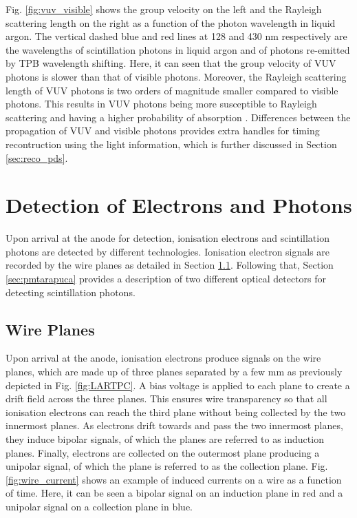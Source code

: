 Fig. \ref{fig:vuv_visible} shows the group velocity on the left and the Rayleigh scattering length on the right as a function of the photon wavelength in liquid argon.
The vertical dashed blue and red lines at 128 and 430 nm respectively are the wavelengths of scintillation photons in liquid argon and of photons re-emitted by TPB wavelength shifting. 
Here, it can seen that the group velocity of VUV photons is slower than that of visible photons.
Moreover, the Rayleigh scattering length of VUV photons is two orders of magnitude smaller compared to visible photons.
This results in VUV photons being more susceptible to Rayleigh scattering and having a higher probability of absorption \cite{PatrickPhD}.
Differences between the propagation of VUV and visible photons provides extra handles for timing recontruction using the light information, which is further discussed in Section \ref{sec:reco_pds}.

\section{Detection of Electrons and Photons}

\label{sec3:detection}

Upon arrival at the anode for detection, ionisation electrons and scintillation photons are detected by different technologies.
Ionisation electron signals are recorded by the wire planes as detailed in Section \ref{sec:wire}.
Following that, Section \ref{sec:pmtarapuca} provides a description of two different optical detectors for detecting scintillation photons.

\subsection{Wire Planes}
\label{sec:wire}

Upon arrival at the anode, ionisation electrons produce signals on the wire planes, which are made up of three planes separated by a few mm as previously depicted in Fig. \ref{fig:LARTPC}.
A bias voltage is applied to each plane to create a drift field across the three planes.
This ensures wire transparency so that all ionisation electrons can reach the third plane without being collected by the two innermost planes.
As electrons drift towards and pass the two innermost planes, they induce bipolar signals, of which the planes are referred to as induction planes.
Finally, electrons are collected on the outermost plane producing a unipolar signal, of which the plane is referred to as the collection plane.
Fig. \ref{fig:wire_current} shows an example of induced currents on a wire as a function of time.
Here, it can be seen a bipolar signal on an induction plane in red and a unipolar signal on a collection plane in blue.

